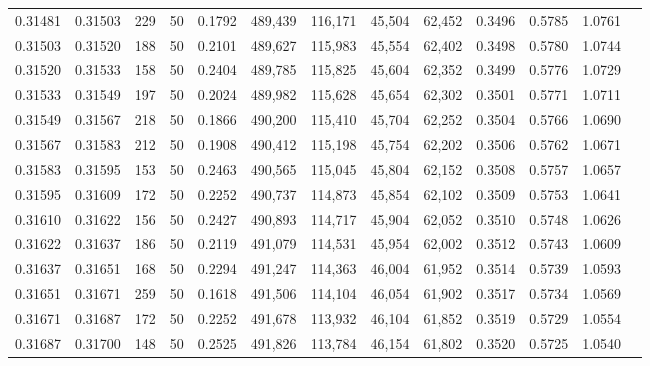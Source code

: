 \begin{tabular}{rrrrrrrrrrrrr}
0.31481 & 0.31503 &   229 &  50 &                                     0.1792 & 489,439 & 116,171 &  45,504 &  62,452 & 0.3496 & 0.5785 & 1.0761 \\
0.31503 & 0.31520 &   188 &  50 &                                     0.2101 & 489,627 & 115,983 &  45,554 &  62,402 & 0.3498 & 0.5780 & 1.0744 \\
0.31520 & 0.31533 &   158 &  50 &                                     0.2404 & 489,785 & 115,825 &  45,604 &  62,352 & 0.3499 & 0.5776 & 1.0729 \\
0.31533 & 0.31549 &   197 &  50 &                                     0.2024 & 489,982 & 115,628 &  45,654 &  62,302 & 0.3501 & 0.5771 & 1.0711 \\
0.31549 & 0.31567 &   218 &  50 &                                     0.1866 & 490,200 & 115,410 &  45,704 &  62,252 & 0.3504 & 0.5766 & 1.0690 \\
0.31567 & 0.31583 &   212 &  50 &                                     0.1908 & 490,412 & 115,198 &  45,754 &  62,202 & 0.3506 & 0.5762 & 1.0671 \\
0.31583 & 0.31595 &   153 &  50 &                                     0.2463 & 490,565 & 115,045 &  45,804 &  62,152 & 0.3508 & 0.5757 & 1.0657 \\
0.31595 & 0.31609 &   172 &  50 &                                     0.2252 & 490,737 & 114,873 &  45,854 &  62,102 & 0.3509 & 0.5753 & 1.0641 \\
0.31610 & 0.31622 &   156 &  50 &                                     0.2427 & 490,893 & 114,717 &  45,904 &  62,052 & 0.3510 & 0.5748 & 1.0626 \\
0.31622 & 0.31637 &   186 &  50 &                                     0.2119 & 491,079 & 114,531 &  45,954 &  62,002 & 0.3512 & 0.5743 & 1.0609 \\
0.31637 & 0.31651 &   168 &  50 &                                     0.2294 & 491,247 & 114,363 &  46,004 &  61,952 & 0.3514 & 0.5739 & 1.0593 \\
0.31651 & 0.31671 &   259 &  50 &                                     0.1618 & 491,506 & 114,104 &  46,054 &  61,902 & 0.3517 & 0.5734 & 1.0569 \\
0.31671 & 0.31687 &   172 &  50 &                                     0.2252 & 491,678 & 113,932 &  46,104 &  61,852 & 0.3519 & 0.5729 & 1.0554 \\
0.31687 & 0.31700 &   148 &  50 &                                     0.2525 & 491,826 & 113,784 &  46,154 &  61,802 & 0.3520 & 0.5725 & 1.0540 \\

\end{tabular}
